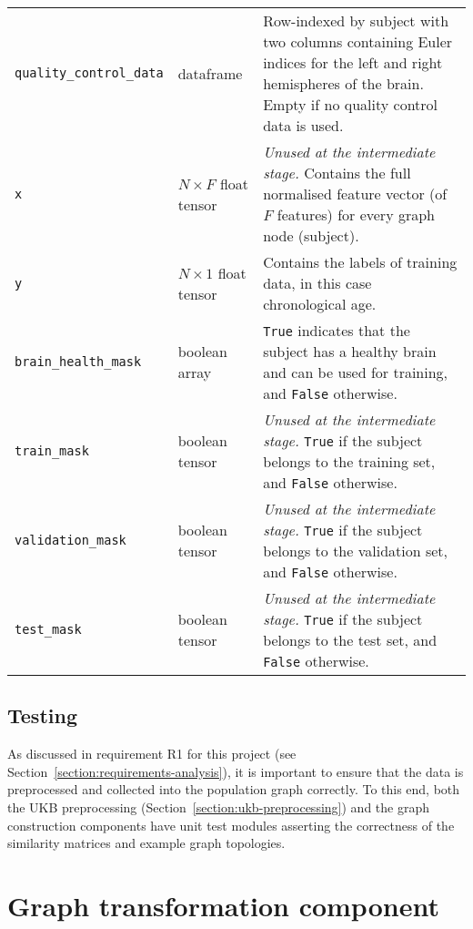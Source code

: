 \begin{center}
\begin{longtable}[]{lp{}p{}}
    \texttt{quality\_control\_data} & dataframe & Row-indexed by subject with two columns containing Euler indices for the left and right hemispheres of the brain. Empty if no quality control data is used. \\
    \texttt{x} & $N \times F$ \hfill\newline float tensor & \textit{Unused at the intermediate stage.} Contains the full normalised feature vector (of $F$ features) for every graph node (subject). \\
    \texttt{y} & $N \times 1$ \hfill \newline float tensor & Contains the labels of training data, in this case chronological age. \\
    \texttt{brain\_health\_mask} & boolean array & \texttt{True} indicates that the subject has a healthy brain and can be used for training, and \texttt{False} otherwise. \\
    \texttt{train\_mask} & boolean tensor & \textit{Unused at the intermediate stage.} \texttt{True} if the subject belongs to the training set, and \texttt{False} otherwise. \\
    \texttt{validation\_mask} & boolean tensor & \textit{Unused at the intermediate stage.} \texttt{True} if the subject belongs to the validation set, and \texttt{False} otherwise. \\
    \texttt{test\_mask} & boolean tensor & \textit{Unused at the intermediate stage.} \texttt{True} if the subject belongs to the test set, and \texttt{False} otherwise.
\end{longtable}
\end{center}

\subsection{Testing}
As discussed in requirement R1 for this project (see Section~\ref{section:requirements-analysis}), it is important to ensure that the data is preprocessed and collected into the population graph correctly. To this end, both the UKB preprocessing (Section~\ref{section:ukb-preprocessing}) and the graph construction components have unit test modules asserting the correctness of the similarity matrices and example graph topologies.

\section{Graph transformation component}
\label{section:graph-transformation}

